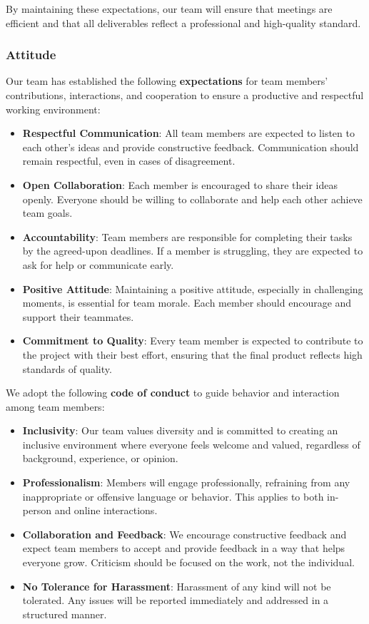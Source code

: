 \documentclass{article}
\begin{document}
\noindent
By maintaining these expectations, our team will ensure that meetings
are efficient and that all deliverables reflect a professional and
high-quality standard.

\subsubsection*{\color{blue}Attitude}

Our team has established the following \textbf{expectations} for team
members' contributions, interactions, and cooperation to ensure a
productive and respectful working environment:

\begin{itemize}
  \item \textbf{Respectful Communication}: All team members are
    expected to listen to each other’s ideas and provide constructive
    feedback. Communication should remain respectful, even in cases
    of disagreement.
  \item \textbf{Open Collaboration}: Each member is encouraged to
    share their ideas openly. Everyone should be willing to
    collaborate and help each other achieve team goals.
  \item \textbf{Accountability}: Team members are responsible for
    completing their tasks by the agreed-upon deadlines. If a member
    is struggling, they are expected to ask for help or communicate early.
  \item \textbf{Positive Attitude}: Maintaining a positive attitude,
    especially in challenging moments, is essential for team morale.
    Each member should encourage and support their teammates.
  \item \textbf{Commitment to Quality}: Every team member is expected
    to contribute to the project with their best effort, ensuring
    that the final product reflects high standards of quality.
\end{itemize}

\noindent
We adopt the following \textbf{code of conduct} to guide behavior and
interaction among team members:

\begin{itemize}
  \item \textbf{Inclusivity}: Our team values diversity and is
    committed to creating an inclusive environment where everyone
    feels welcome and valued, regardless of background, experience, or opinion.
  \item \textbf{Professionalism}: Members will engage professionally,
    refraining from any inappropriate or offensive language or
    behavior. This applies to both in-person and online interactions.
  \item \textbf{Collaboration and Feedback}: We encourage
    constructive feedback and expect team members to accept and
    provide feedback in a way that helps everyone grow. Criticism
    should be focused on the work, not the individual.
  \item \textbf{No Tolerance for Harassment}: Harassment of any kind
    will not be tolerated. Any issues will be reported immediately
    and addressed in a structured manner.
\end{itemize}
\end{document}
